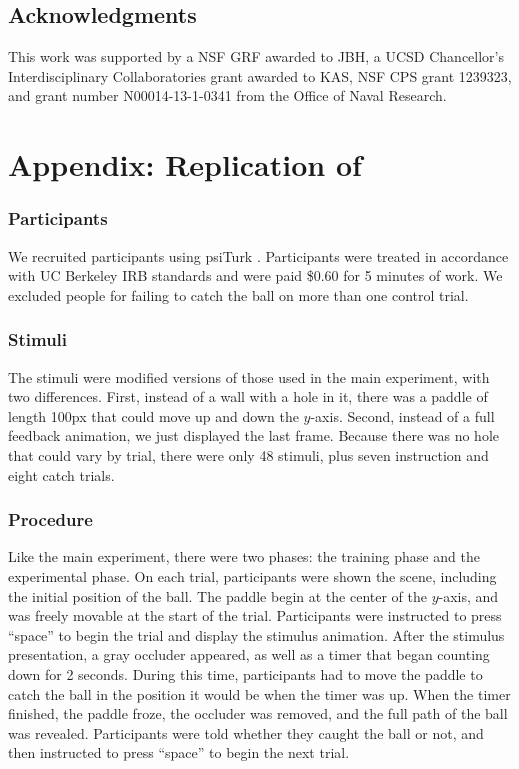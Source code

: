 \documentclass[10pt,letterpaper]{article}
\begin{document}
\subsection{Acknowledgments}

This work was supported by a NSF GRF awarded to JBH, a UCSD Chancellor’s Interdisciplinary Collaboratories grant awarded to KAS, NSF CPS grant 1239323, and grant number N00014-13-1-0341 from the Office of Naval Research.

\section{Appendix: Replication of }

\subsubsection{Participants}

We recruited \PaddleNumComplete{} participants using psiTurk \cite{McDonnell12}.
Participants were treated in accordance with UC Berkeley IRB standards and were paid \$0.60 for 5 minutes of work.
We excluded \PaddleNumFailed{} people for failing to catch the ball on more than one control trial.

\subsubsection{Stimuli}

The stimuli were modified versions of those used in the main experiment, with two differences.
First, instead of a wall with a hole in it, there was a paddle of length 100px that could move up and down the $y$-axis.
Second, instead of a full feedback animation, we just displayed the last frame.
Because there was no hole that could vary by trial, there were only 48 stimuli, plus seven instruction and eight catch trials.

\subsubsection{Procedure}

Like the main experiment, there were two phases: the training phase and the experimental phase.
On each trial, participants were shown the scene, including the initial position of the ball.
The paddle begin at the center of the $y$-axis, and was freely movable at the start of the trial.
Participants were instructed to press ``space'' to begin the trial and display the stimulus animation.
After the stimulus presentation, a gray occluder appeared, as well as a timer that began counting down for 2 seconds.
During this time, participants had to move the paddle to catch the ball in the position it would be when the timer was up.
When the timer finished, the paddle froze, the occluder was removed, and the full path of the ball was revealed.
Participants were told whether they caught the ball or not, and then instructed to press ``space'' to begin the next trial.
\end{document}
